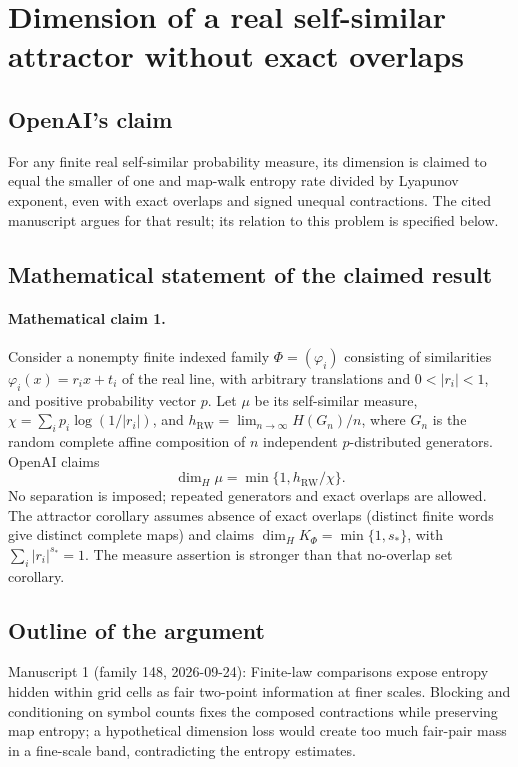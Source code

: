 \documentclass[11pt]{article}
\begin{document}
\section*{Dimension of a real self-similar attractor without exact overlaps}

\subsection{OpenAI's claim}
For any finite real self-similar probability measure, its dimension is claimed to equal the smaller of one and map-walk entropy rate divided by Lyapunov exponent, even with exact overlaps and signed unequal contractions. The cited manuscript argues for that result; its relation to this problem is specified below.

\subsection{Mathematical statement of the claimed result}
\paragraph{Mathematical claim 1.} Consider a nonempty finite indexed family $\Phi=(\varphi_i)$ consisting of similarities $\varphi_i(x)=r_ix+t_i$ of the real line, with arbitrary translations and $0<|r_i|<1$, and positive probability vector $p$. Let $\mu$ be its self-similar measure, $\chi=\sum_i p_i\log(1/|r_i|)$, and $h_{\mathrm{RW}}=\lim_{n\to\infty}H(G_n)/n$, where $G_n$ is the random complete affine composition of $n$ independent $p$-distributed generators. OpenAI claims
\[
\dim_H\mu=\min\{1,h_{\mathrm{RW}}/\chi\}.
\]
No separation is imposed; repeated generators and exact overlaps are allowed. The attractor corollary assumes absence of exact overlaps (distinct finite words give distinct complete maps) and claims $\dim_HK_\Phi=\min\{1,s_*\}$, with $\sum_i|r_i|^{s_*}=1$. The measure assertion is stronger than that no-overlap set corollary.

\subsection{Outline of the argument}
Manuscript 1 (family 148, 2026-09-24): Finite-law comparisons expose entropy hidden within grid cells as fair two-point information at finer scales. Blocking and conditioning on symbol counts fixes the composed contractions while preserving map entropy; a hypothetical dimension loss would create too much fair-pair mass in a fine-scale band, contradicting the entropy estimates.
\end{document}
